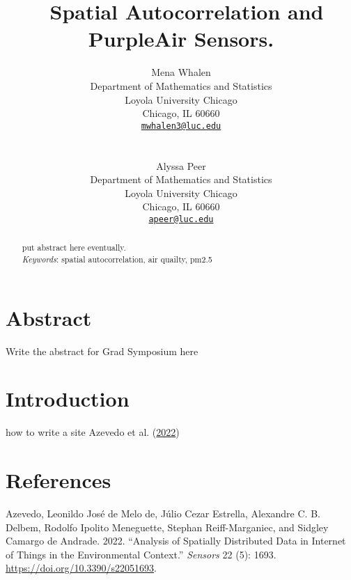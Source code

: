\documentclass[
  12pt,
]{article}
\title{~\Large Spatial Autocorrelation and PurpleAir Sensors.}
\author{\large Mena Whalen \vspace{-1.1mm}\\
\normalsize Department of Mathematics and Statistics \vspace{-1mm}\\
\normalsize Loyola University Chicago \vspace{-1mm}\\
\normalsize Chicago, IL 60660 \vspace{-1mm}\\
\normalsize \href{mailto:mwhalen3@luc.edu}{\texttt{mwhalen3@luc.edu}}
\vspace{-1mm}\\
\strut \\
\large Alyssa Peer \vspace{-1.1mm}\\
\normalsize Department of Mathematics and Statistics \vspace{-1mm}\\
\normalsize Loyola University Chicago \vspace{-1mm}\\
\normalsize Chicago, IL 60660 \vspace{-1mm}\\
\normalsize \href{mailto:apeer@luc.edu}{\texttt{apeer@luc.edu}}
\vspace{-1mm}}
\date{}
\newlength{\cslhangindent}
\newlength{\cslentryspacingunit} %
\newenvironment{CSLReferences}[2] %
 {%
  \setlength{\parindent}{0pt}
  \ifodd #1
  \let\oldpar\par
  \def\par{\hangindent=\cslhangindent\oldpar}
  \fi
  \setlength{\parskip}{#2\cslentryspacingunit}
 }%
 {}
\begin{document}
\maketitle
\begin{abstract}
put abstract here eventually. \vspace{2mm}\\
\emph{Keywords}: spatial autocorrelation, air quailty, pm2.5
\end{abstract}

\newpage

\hypertarget{sec:abs}{%
\section{Abstract}\label{sec:abs}}

Write the abstract for Grad Symposium here

\hypertarget{sec:intro}{%
\section{Introduction}\label{sec:intro}}

how to write a site Azevedo et al.
(\protect\hyperlink{ref-de_azevedo_analysis_2022}{2022})

\hypertarget{references}{%
\section*{References}\label{references}}

\hypertarget{refs}{}
\begin{CSLReferences}{1}{0}
\leavevmode{}%
Azevedo, Leonildo José de Melo de, Júlio Cezar Estrella, Alexandre C. B.
Delbem, Rodolfo Ipolito Meneguette, Stephan Reiff-Marganiec, and Sidgley
Camargo de Andrade. 2022. {``Analysis of {Spatially} {Distributed}
{Data} in {Internet} of {Things} in the {Environmental} {Context}.''}
\emph{Sensors} 22 (5): 1693. \url{https://doi.org/10.3390/s22051693}.

\end{CSLReferences}
\end{document}
